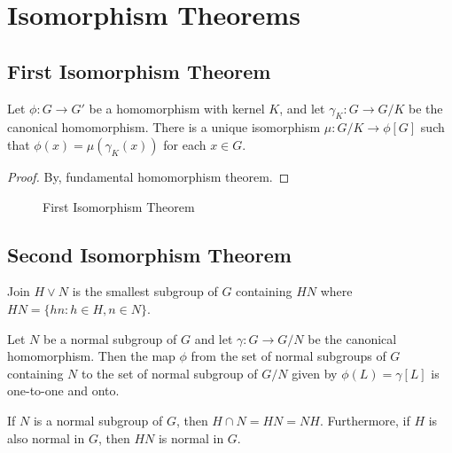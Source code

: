 \section{Isomorphism Theorems}
\subsection{First Isomorphism Theorem}
\begin{theorem}
	Let $\phi : G \to G'$ be a homomorphism with kernel $K$, and let $\gamma_K : G \to G/K$ be the canonical homomorphism.
	There is a unique isomorphism $\mu : G/K \to \phi[G]$ such that $\phi(x) = \mu(\gamma_K(x))$ for each $x \in G$.
\end{theorem}
\begin{proof}
	By, fundamental homomorphism theorem.
\end{proof}
\begin{figure}[h]
	\centering
	\caption{First Isomorphism Theorem}
\end{figure}

\subsection{Second Isomorphism Theorem}
\begin{definition}

	Join $H \vee N$ is the smallest subgroup of $G$ containing $HN$ where $HN = \{ hn : h \in H, n \in N\}$.
\end{definition}

\begin{lemma}
	Let $N$ be a normal subgroup of $G$ and let $\gamma : G \to G/N$ be the canonical homomorphism.
	Then the map $\phi$ from the set of normal subgroups of $G$ containing $N$ to the set of normal subgroup of $G/N$ given by $\phi(L) = \gamma[L]$ is one-to-one and onto.
\end{lemma}

\begin{lemma}
	If $N$ is a normal subgroup of $G$, then $H \cap N = HN = NH$.
	Furthermore, if $H$ is also normal in $G$, then $HN$ is normal in $G$.
\end{lemma}

